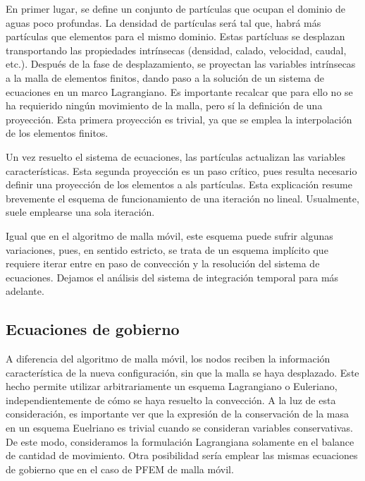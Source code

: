 En primer lugar, se define un conjunto de partículas que ocupan el dominio de aguas poco profundas. La densidad de partículas será tal que, habrá más partículas que elementos para el mismo dominio. Estas partícluas se desplazan transportando las propiedades intrínsecas (densidad, calado, velocidad, caudal, etc.). Después de la fase de desplazamiento, se proyectan las variables intrínsecas a la malla de elementos finitos, dando paso a la solución de un sistema de ecuaciones en un marco Lagrangiano. Es importante recalcar que para ello no se ha requierido ningún movimiento de la malla, pero sí la definición de una proyección. Esta primera proyección es trivial, ya que se emplea la interpolación de los elementos finitos.




Un vez resuelto el sistema de ecuaciones, las partículas actualizan las variables características. Esta segunda proyección es un paso crítico, pues resulta necesario definir una proyección de los elementos a als partículas. Esta explicación resume brevemente el esquema de funcionamiento de una iteración no lineal. Usualmente, suele emplearse una sola iteración.

Igual que en el algoritmo de malla móvil, este esquema puede sufrir algunas variaciones, pues, en sentido estricto, se trata de un esquema implícito que requiere iterar entre en paso de convección y la resolución del sistema de ecuaciones. Dejamos el análisis del sistema de integración temporal para más adelante.


\subsection{Ecuaciones de gobierno}

A diferencia del algoritmo de malla móvil, los nodos reciben la información característica de la nueva configuración, sin que la malla se haya desplazado. Este hecho permite utilizar arbitrariamente un esquema Lagrangiano o Euleriano, independientemente de cómo se haya resuelto la convección. A la luz de esta consideración, es importante ver que la expresión de la conservación de la masa en un esquema Euelriano es trivial cuando se consideran variables conservativas. De este modo, consideramos la formulación Lagrangiana solamente en el balance de cantidad de movimiento. Otra posibilidad sería emplear las mismas ecuaciones de gobierno que en el caso de PFEM de malla móvil.

